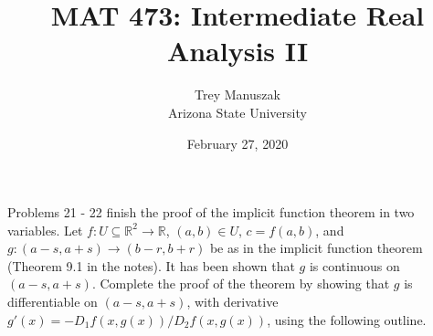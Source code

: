 \documentclass[12pt]{article}
\title{MAT 473: Intermediate Real Analysis II}
\date{February 27, 2020}
\author{Trey Manuszak\\ Arizona State University}
\begin{document}




\maketitle
\newpage





Problems 21 - 22 finish the proof of the implicit function theorem in two variables. Let $f : U \subseteq \mathbb{R}^2 \to \mathbb{R}$, $(a,b) \in U$, $c = f(a,b)$, and $g : (a-s,a+s) \to (b-r,b+r)$ be as in the implicit function theorem (Theorem 9.1 in the notes). It has been shown that $g$ is continuous on $(a-s, a+s)$. Complete the proof of the theorem by showing that $g$ is differentiable on $(a-s,a+s)$, with derivative $g'(x) = -D_1f(x,g(x))/D_2f(x,g(x))$, using the following outline.
\end{document}

